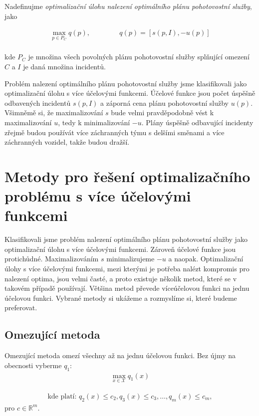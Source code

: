 Nadefinujme \textit{optimalizační úlohu nalezení optimálního plánu pohotovostní služby}, jako
\\
\begin{definice}
  \begin{align*}
    \max_{p \in P_C} q(p), \hspace{50pt} q(p) = [s(p, I), -u(p)]
  \end{align*}
  \\
  kde $P_C$ je množina všech povolných plánu pohotovostní služby splňující omezení $C$ a $I$ je daná množina incidentů.
\end{definice}

Problém nalezení optimálního plánu pohotovostní služby jsme klasifikovali jako optimalizační úlohu s více účelovými funkcemi.
Účelové funkce jsou počet úspěšně odbavených incidentů $s(p, I)$ a záporná cena plánu pohotovostní služby $u(p)$.
Všimněmě si, že maximalizování $s$ bude velmi pravděpodobně vést k maximalizování $u$, tedy k minimalizování $-u$.
Plány úspěšně odbavující incidenty zřejmě budou používát více záchranných týmu s delšími směnami a více záchranných vozidel, takže budou dražší.

\clearpage

\section{Metody pro řešení optimalizačního problému s více účelovými funkcemi}\label{kap:metodyProReseniOptSViceUcel}

Klasifikovali jsme problém nalezení optimálního plánu pohotovostní služby jako optimalizační úlohu s více účelovými funkcemi.
Zároveň účelové funkce jsou protichůdné. Maximalizováním $s$ minimalizujeme $-u$ a naopak.
Optimalizační úlohy s více účelovými funkcemi, mezi kterými je potřeba nalézt kompromis pro nalezení optima, jsou velmi časté,
a proto existuje několik metod, které se v takovém případě používají.
Většina metod převede víceúčelovou funkci na jednu účelovou funkci.
Vybrané metody si ukážeme a rozmyslíme si, které budeme preferovat. 

\subsection{Omezující metoda}

\begin{definice}
  Omezující metoda omezí všechny až na jednu účelovou funkci. Bez újmy na obecnosti vyberme $q_1$:
  \begin{align*}
    \max_{x \in \mathcal{X}} q_1(x)
  \end{align*}

  \begin{align*}
    \text{kde platí: } q_2(x) \leq c_2, q_3(x) \leq c_3, \dots, q_m(x) \leq c_m,
  \end{align*}
  pro $c \in \mathbb{R}^m$.
  \\
\end{definice}

